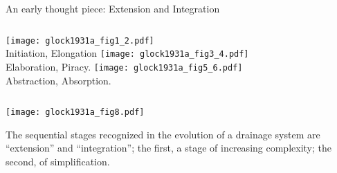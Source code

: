 \begin{frame}

  \begin{block}{An early thought piece: Extension and Integration}
  \end{block}

    \bigskip

    \begin{columns}
      \texttt{[image: glock1931a\_fig1\_2.pdf]}\\
      Initiation, Elongation
      \texttt{[image: glock1931a\_fig3\_4.pdf]}\\
      Elaboration, Piracy.
      \texttt{[image: glock1931a\_fig5\_6.pdf]}\\
      Abstraction, Absorption.
    \end{columns}


\end{frame}

\begin{frame}
  
  \begin{center}
    \texttt{[image: glock1931a\_fig8.pdf]}

    \begin{block}
      The sequential stages recognized in the evolution of a drainage
      system
      are ``extension'' and ``integration''; the first, a stage of
      increasing complexity; the second, of simplification.
    \end{block}
  \end{center}

\end{frame}




